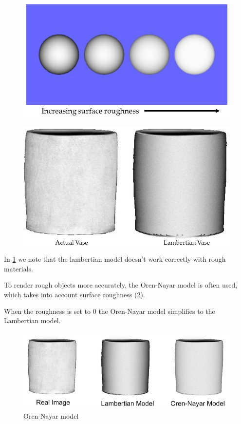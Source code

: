 \documentclass[tikz,14pt,fleqn]{article}
\begin{document}
\begin{figure}[!hb]
   \centering
   \begin{minipage}{.5\textwidth}
     \centering
     \includegraphics[width=.8\linewidth]{fig/increasing_surface_roughness.png}
     \label{fig:increasing_roughness}
   \end{minipage}%
   \begin{minipage}{.5\textwidth}
     \centering
     \includegraphics[width=.8\linewidth]{fig/actual_VS_lambertian-vase.png}
     \label{fig:vases}
   \end{minipage}
\end{figure}

In \cref{fig:vases} we note that the lambertian model doesn't work correctly with rough materials.

To render rough objects more accurately, the Oren-Nayar model is often used, which takes into account surface roughness (\cref{fig:Oren-Nayar}).

When the roughness is set to 0 the Oren-Nayar model simplifies to the Lambertian model.


\begin{figure}[!h]
   \centering
   \includegraphics[width=0.7\linewidth]{fig/Oren-Nayar-Model-Vase.png} 
   \caption{Oren-Nayar model}
   \label{fig:Oren-Nayar}
\end{figure}
\end{document}
